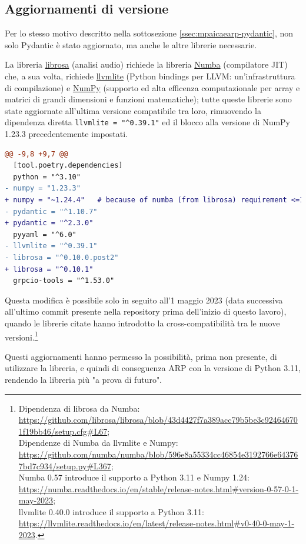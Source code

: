 \subsection{Aggiornamenti di versione} \label{ssec:mpaicaearp-aggiornamenti}
Per lo stesso motivo descritto nella sottosezione \ref{ssec:mpaicaearp-pydantic}, non solo Pydantic è stato aggiornato, ma anche le altre librerie necessarie.

La libreria \href{https://librosa.org/}{librosa} (analisi audio) richiede la libreria \href{https://numba.pydata.org/}{Numba} (compilatore JIT) che, a sua volta, richiede \href{https://llvmlite.readthedocs.io/en/latest/}{llvmlite} (Python bindings per LLVM: un'infrastruttura di compilazione) e \href{https://numpy.org/}{NumPy} (supporto ed alta efficenza computazionale per array e matrici di grandi dimensioni e funzioni matematiche); tutte queste librerie sono state aggiornate all'ultima versione compatibile tra loro, rimuovendo la dipendenza diretta \verb|llvmlite = "^0.39.1"| ed il blocco alla versione di NumPy 1.23.3 precedentemente impostati.
\begin{lstlisting}[language=diff, caption={\texttt{pyproject.toml}, aggiornamento delle dipendenze}]
@@ -9,8 +9,7 @@
  [tool.poetry.dependencies]
  python = "^3.10"
- numpy = "1.23.3"
+ numpy = "~1.24.4"   # because of numba (from librosa) requirement <=1.24
- pydantic = "^1.10.7"
+ pydantic = "^2.3.0"
  pyyaml = "^6.0"
- llvmlite = "^0.39.1" 
- librosa = "^0.10.0.post2"
+ librosa = "^0.10.1"
  grpcio-tools = "^1.53.0"
\end{lstlisting}
Questa modifica è possibile solo in seguito all'1 maggio 2023 (data successiva all'ultimo commit presente nella repository prima dell'inizio di questo lavoro), quando le librerie citate hanno introdotto la cross-compatibilità tra le nuove versioni.\footnote{Dipendenza di librosa da Numba: \url{https://github.com/librosa/librosa/blob/43d4427f7a389acc79b5be3c924646701f19bb46/setup.cfg\#L67};\\
Dipendenze di Numba da llvmlite e Numpy: \url{https://github.com/numba/numba/blob/596e8a55334cc46854e3192766e643767bd7c934/setup.py\#L367};\\
Numba 0.57 introduce il supporto a Python 3.11 e Numpy 1.24: \url{https://numba.readthedocs.io/en/stable/release-notes.html\#version-0-57-0-1-may-2023};\\
llvmlite 0.40.0 introduce il supporto a Python 3.11: \url{https://llvmlite.readthedocs.io/en/latest/release-notes.html\#v0-40-0-may-1-2023}.}

Questi aggiornamenti hanno permesso la possibilità, prima non presente, di utilizzare la libreria, e quindi di conseguenza \ac{ARP} con la versione di Python 3.11, rendendo la libreria più "a prova di futuro".
